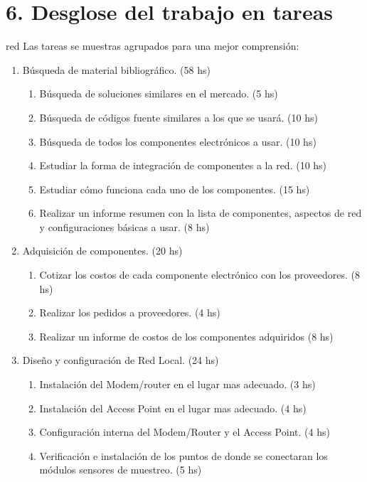 \documentclass[11pt]{charter}
\begin{document}
\section{6. Desglose del trabajo en tareas}
\label{sec:wbs}

\begin{consigna}{red}
Las tareas se muestras agrupados para una mejor comprensión:
\begin{enumerate}
\item Búsqueda de material bibliográfico. (58 hs)
	\begin{enumerate}
	\item Búsqueda de soluciones similares en el mercado. (5 hs)
	\item Búsqueda de códigos fuente similares a los que se usará. (10 hs)
	\item Búsqueda de todos los componentes electrónicos a usar. (10 hs)
	\item Estudiar la forma de integración de componentes a la red. (10 hs)
	\item Estudiar cómo funciona cada uno de los componentes. (15 hs)
	\item Realizar un informe resumen con la lista de componentes, aspectos de red y configuraciones básicas a usar. (8 hs)
	\end{enumerate}
\item Adquisición de componentes. (20 hs)
	\begin{enumerate}
	\item Cotizar los costos de cada componente electrónico con los proveedores. (8 hs)
	\item Realizar los pedidos a proveedores. (4 hs)
	\item Realizar un informe de costos de los componentes adquiridos (8 hs)
	\end{enumerate}
\item Diseño y configuración de Red Local. (24 hs)
	\begin{enumerate}
	\item Instalación del Modem/router en el lugar mas adecuado. (3 hs)
	\item Instalación del Access Point en el lugar mas adecuado. (4 hs)
	\item Configuración interna del Modem/Router y el Access Point. (4 hs)
	\item Verificación e instalación de los puntos de donde se conectaran los módulos sensores de muestreo. (5 hs)

\end{enumerate}
\end{enumerate}
\end{consigna}
\end{document}
